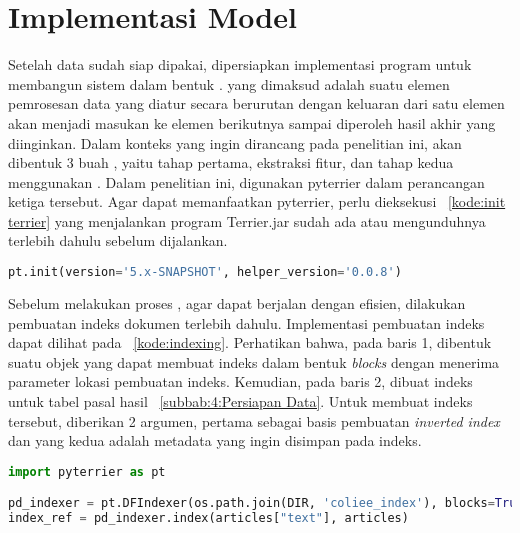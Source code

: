 \section{Implementasi Model}
\label{subbab:4:Implementasi Model}
Setelah data sudah siap dipakai, dipersiapkan implementasi program untuk membangun sistem \ir{} dalam bentuk \pipeline{}. \Pipeline{} yang dimaksud adalah suatu elemen pemrosesan data yang diatur secara berurutan dengan keluaran dari satu elemen akan menjadi masukan ke elemen berikutnya sampai diperoleh hasil akhir yang diinginkan. Dalam konteks \cascaded{} \ir{} yang ingin dirancang pada penelitian ini, akan dibentuk 3 buah \pipeline{}, yaitu \pipeline{} tahap \ranking{} pertama, \pipeline{} ekstraksi fitur, dan \pipeline{} tahap \ranking{} kedua menggunakan \lambdamart{}. Dalam penelitian ini, digunakan \library{} pyterrier dalam perancangan ketiga \pipeline{} tersebut. Agar dapat memanfaatkan pyterrier, perlu dieksekusi \kode{}~\ref{kode:init terrier} yang menjalankan program Terrier.jar sudah ada atau mengunduhnya terlebih dahulu sebelum dijalankan.
\begin{lstlisting}[language=Python, caption={Menjalankan program Terrier}, label={kode:init terrier}]
pt.init(version='5.x-SNAPSHOT', helper_version='0.0.8')
\end{lstlisting}

Sebelum melakukan proses \retrieval{}, agar dapat berjalan dengan efisien, dilakukan pembuatan indeks dokumen terlebih dahulu. Implementasi pembuatan indeks dapat dilihat pada \kode{}~\ref{kode:indexing}. Perhatikan bahwa, pada baris 1, dibentuk suatu objek yang dapat membuat indeks dalam bentuk \textit{blocks} dengan menerima parameter lokasi pembuatan indeks. Kemudian, pada baris 2, dibuat indeks untuk tabel pasal hasil \parsing{} \subbab{}~\ref{subbab:4:Persiapan Data}. Untuk membuat indeks tersebut, diberikan 2 argumen, pertama sebagai basis pembuatan \textit{inverted index} dan yang kedua adalah metadata yang ingin disimpan pada indeks.
\begin{lstlisting}[language=Python, caption={Pembentukan indeks}, label={kode:indexing}]
import pyterrier as pt

pd_indexer = pt.DFIndexer(os.path.join(DIR, 'coliee_index'), blocks=True)
index_ref = pd_indexer.index(articles["text"], articles)
\end{lstlisting}

